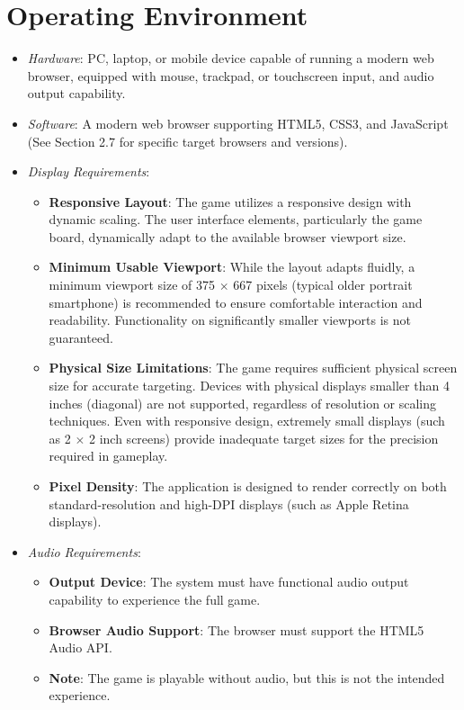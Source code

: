 \documentclass[11pt]{scrreprt}
\begin{document}
\section{Operating Environment}
\begin{itemize}
    \item \emph{Hardware}: PC, laptop, or mobile device capable of running a modern web browser, equipped with mouse, trackpad, or touchscreen input, and audio output capability.
    \item \emph{Software}: A modern web browser supporting HTML5, CSS3, and JavaScript (See Section 2.7 for specific target browsers and versions).
    \item \emph{Display Requirements}:
        \begin{itemize}
            \item \textbf{Responsive Layout}: The game utilizes a responsive design with dynamic scaling. The user interface elements, particularly the game board, dynamically adapt to the available browser viewport size.
            \item \textbf{Minimum Usable Viewport}: While the layout adapts fluidly, a minimum viewport size of 375 $\times$ 667 pixels (typical older portrait smartphone) is recommended to ensure comfortable interaction and readability. Functionality on significantly smaller viewports is not guaranteed.
            \item \textbf{Physical Size Limitations}: The game requires sufficient physical screen size for accurate targeting. Devices with physical displays smaller than 4 inches (diagonal) are not supported, regardless of resolution or scaling techniques. Even with responsive design, extremely small displays (such as 2 $\times$ 2 inch screens) provide inadequate target sizes for the precision required in gameplay.
            \item \textbf{Pixel Density}: The application is designed to render correctly on both standard-resolution and high-DPI displays (such as Apple Retina displays).
        \end{itemize}
    \item \emph{Audio Requirements}:
        \begin{itemize}
            \item \textbf{Output Device}: The system must have functional audio output capability to experience the full game.
            \item \textbf{Browser Audio Support}: The browser must support the HTML5 Audio API.
            \item \textbf{Note}: The game is playable without audio, but this is not the intended experience.
        \end{itemize}
\end{itemize}
\end{document}
